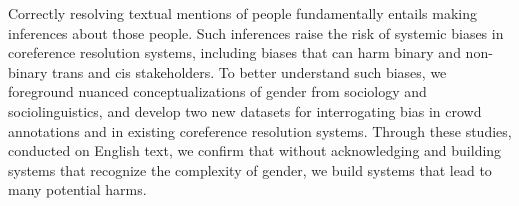 Correctly resolving textual mentions of people fundamentally entails making inferences about those people. Such inferences raise the risk of systemic biases in coreference resolution systems, including biases that can harm binary and non-binary trans and cis stakeholders. To better understand such biases, we foreground nuanced conceptualizations of gender from sociology and sociolinguistics, and develop two new datasets for interrogating bias in crowd annotations and in existing coreference resolution systems. Through these studies, conducted on English text, we confirm that without acknowledging and building systems that recognize the complexity of gender, we build systems that lead to many potential harms.
